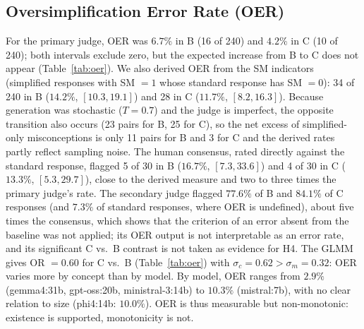 \documentclass[journal,article,submit,pdftex,moreauthors]{Definitions/mdpi}
\begin{document}
\subsection{Oversimplification Error Rate (OER)}

For the primary judge, OER was $6.7\%$ in B (16 of 240) and $4.2\%$ in C (10 of 240); both intervals exclude zero, but the expected increase from B to C does not appear (Table~\ref{tab:oer}). We also derived OER from the SM indicators (simplified responses with SM $= 1$ whose standard response has SM $= 0$): 34 of 240 in B ($14.2\%$, $[10.3, 19.1]$) and 28 in C ($11.7\%$, $[8.2, 16.3]$). Because generation was stochastic ($T = 0.7$) and the judge is imperfect, the opposite transition also occurs (23 pairs for B, 25 for C), so the net excess of simplified-only misconceptions is only 11 pairs for B and 3 for C and the derived rates partly reflect sampling noise. The human consensus, rated directly against the standard response, flagged 5 of 30 in B ($16.7\%$, $[7.3, 33.6]$) and 4 of 30 in C ($13.3\%$, $[5.3, 29.7]$), close to the derived measure and two to three times the primary judge's rate. The secondary judge flagged $77.6\%$ of B and $84.1\%$ of C responses (and $7.3\%$ of standard responses, where OER is undefined), about five times the consensus, which shows that the criterion of an error absent from the baseline was not applied; its OER output is not interpretable as an error rate, and its significant C vs.\ B contrast is not taken as evidence for H4. The GLMM gives OR $= 0.60$ for C vs.\ B (Table~\ref{tab:oer}) with $\sigma_c = 0.62 > \sigma_m = 0.32$: OER varies more by concept than by model. By model, OER ranges from $2.9\%$ (gemma4:31b, gpt-oss:20b, ministral-3:14b) to $10.3\%$ (mistral:7b), with no clear relation to size (phi4:14b: $10.0\%$). OER is thus measurable but non-monotonic: existence is supported, monotonicity is not.
\end{document}
